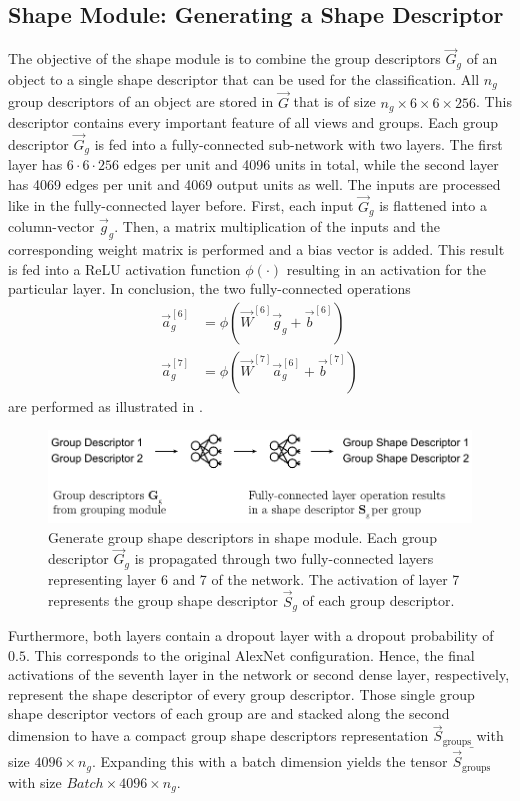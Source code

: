 \subsection{Shape Module: Generating a Shape Descriptor}
\label{sec:architecture-shape-module}
The objective of the shape module is to combine the group descriptors $\vec{G}_g$ of an object to a single shape descriptor that can be used for the classification.
All $n_g$ group descriptors of an object are stored in $\vec{G}$ that is of size $n_g \times 6 \times 6 \times 256$.
This descriptor contains every important feature of all views and groups.
Each group descriptor $\vec{G}_g$ is fed into a fully-connected sub-network with two layers.
The first layer has $6\cdot6\cdot256$ edges per unit and 4096 units in total, while the second layer has 4069 edges per unit and 4069 output units as well.
The inputs are processed like in the fully-connected layer before.
First, each input $\vec{G}_g$ is flattened into a column-vector $\vec{g}_g$.
Then, a matrix multiplication of the inputs and the corresponding weight matrix is performed and a bias vector is added.
This result is fed into a ReLU activation function $\phi(\cdot)$ resulting in an activation for the particular layer.
In conclusion, the two fully-connected operations
\begin{subequations}
	\begin{align}
		\vec{a}^{[6]}_g &= \phi(\vec{W}^{[6]} \vec{g}_g + \vec{b}^{[6]}) \\
		\vec{a}^{[7]}_g &= \phi(\vec{W}^{[7]} \vec{a}^{[6]}_g + \vec{b}^{[7]})
	\end{align}
\end{subequations}
are performed as illustrated in .
\begin{figure}
	\centering
	\includegraphics[]{images/shape_module_group_shape.pdf}
	\caption[Generate group shape descriptors in shape module]{Generate group shape descriptors in shape module. Each group descriptor $\vec{G}_g$ is propagated through two fully-connected layers representing layer 6 and 7 of the network. The activation of layer 7 represents the group shape descriptor $\vec{S}_g$ of each group descriptor.}
	\label{fig:shape-module-group-shape}
\end{figure}
Furthermore, both layers contain a dropout layer with a dropout probability of $0.5$.
This corresponds to the original AlexNet configuration.
Hence, the final activations of the seventh layer in the network or second dense layer, respectively, represent the shape descriptor of every group descriptor.
Those single group shape descriptor vectors of each group are and stacked along the second dimension to have a compact group shape descriptors representation $\vec{S}_{\text{groups}}$ with size $4096 \times n_g$.
Expanding this with a batch dimension yields the tensor $\bar{\vec{S}_{\text{groups}}}$ with size $Batch \times 4096 \times n_g$.


